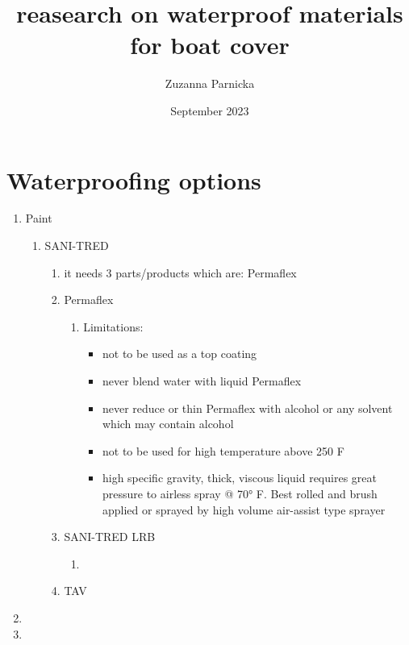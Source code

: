 \documentclass{article}[10pt]
\title{reasearch on waterproof materials for boat cover}
\author{Zuzanna Parnicka}
\date{September 2023}
\begin{document}
\renewcommand{\labelenumii}{\arabic{enumi}.\arabic{enumii}}
\renewcommand{\labelenumiii}{\arabic{enumi}.\arabic{enumii}.\arabic{enumiii}}
\renewcommand{\labelenumiv}{\arabic{enumi}.\arabic{enumii}.\arabic{enumiii}.\arabic{enumiv}}

\maketitle
\section{Waterproofing options}

\begin{enumerate}
    \item Paint
    \begin{enumerate}
        \item SANI-TRED
        \begin{enumerate}
            \item it needs 3 parts/products which are: Permaflex
            \item Permaflex
            \begin{enumerate}
                \item Limitations:
                \begin{itemize}
                \item not to be used as a top coating
                \item never blend water with liquid Permaflex
                \item never reduce or thin Permaflex with alcohol or any solvent which may contain alcohol
                \item not to be used for high temperature above 250 F
                \item high specific gravity, thick, viscous liquid requires great pressure to airless spray @ 70° F. Best rolled and brush applied or sprayed by high volume air-assist type sprayer
                \end{itemize}    
            \end{enumerate}
            \item SANI-TRED LRB
            \begin{enumerate}
                \item 
            \end{enumerate}
            \item TAV
        \end{enumerate}
    \end{enumerate}
    \item 
    \item  
\end{enumerate}
    
\end{document}
